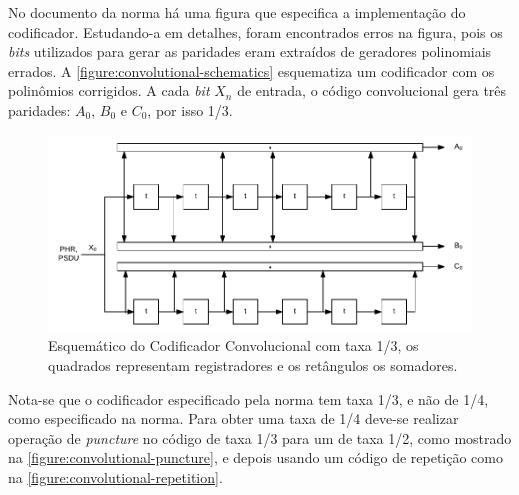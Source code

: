 	No documento da norma há uma figura que especifica a implementação do codificador. Estudando-a em detalhes, foram encontrados erros na figura, pois os \textit{bits} utilizados para gerar as paridades eram extraídos de geradores polinomiais errados. A \autoref{figure:convolutional-schematics} esquematiza um codificador com os polinômios corrigidos. A cada \textit{bit} $X_{n}$ de entrada, o código convolucional gera três paridades: $A_{0}$, $B_{0}$ e $C_{0}$, por isso 1/3.
	\begin{figure}[h!]
		\caption{\label{figure:convolutional-schematics}Esquemático do Codificador Convolucional com taxa 1/3, os quadrados representam registradores e os retângulos os somadores.}
		\centering
		\includegraphics[width=0.5\textheight]{convolutional/schematics.pdf}
	\end{figure}


	Nota-se que o codificador especificado pela norma tem taxa 1/3, e não de 1/4, como especificado na norma. Para obter uma taxa de 1/4 deve-se realizar operação de \textit{puncture} no código de taxa 1/3 para um de taxa 1/2, como mostrado na \autoref{figure:convolutional-puncture}, e depois usando um código de repetição como na \autoref{figure:convolutional-repetition}.

